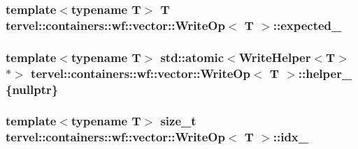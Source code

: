 \subsubsection[{expected\+\_\+}]{\setlength{\rightskip}{0pt plus 5cm}template$<$typename T$>$ T {\bf tervel\+::containers\+::wf\+::vector\+::\+Write\+Op}$<$ T $>$\+::expected\+\_\+\hspace{0.3cm}{\ttfamily [private]}}\label{classtervel_1_1containers_1_1wf_1_1vector_1_1_write_op_a50dce7c9fe835edf72033b665057bc05}
\hypertarget{classtervel_1_1containers_1_1wf_1_1vector_1_1_write_op_ab1239b5ef9dfcabbd9bb4626b036fb3b}{}
\subsubsection[{helper\+\_\+}]{\setlength{\rightskip}{0pt plus 5cm}template$<$typename T$>$ std\+::atomic$<${\bf Write\+Helper}$<$T$>$ $\ast$$>$ {\bf tervel\+::containers\+::wf\+::vector\+::\+Write\+Op}$<$ T $>$\+::helper\+\_\+ \{nullptr\}\hspace{0.3cm}{\ttfamily [private]}}\label{classtervel_1_1containers_1_1wf_1_1vector_1_1_write_op_ab1239b5ef9dfcabbd9bb4626b036fb3b}
\hypertarget{classtervel_1_1containers_1_1wf_1_1vector_1_1_write_op_adeee65a9fa4dbe774d09e29356884ea5}{}
\subsubsection[{idx\+\_\+}]{\setlength{\rightskip}{0pt plus 5cm}template$<$typename T$>$ size\+\_\+t {\bf tervel\+::containers\+::wf\+::vector\+::\+Write\+Op}$<$ T $>$\+::idx\+\_\+\hspace{0.3cm}{\ttfamily [private]}}\label{classtervel_1_1containers_1_1wf_1_1vector_1_1_write_op_adeee65a9fa4dbe774d09e29356884ea5}
\hypertarget{classtervel_1_1containers_1_1wf_1_1vector_1_1_write_op_af75188ef94bec379f9fafb55248491f2}{}
